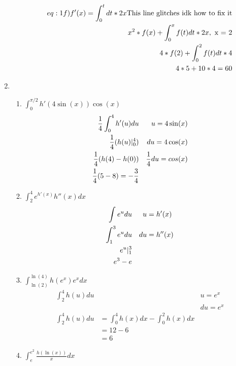 \documentclass[11pt]{article}
\begin{document}
\begin{enumerate}
\begin{enumerate}
            \begin{align*}
                \label(eq:1f)
                f'(x) = \int_{0}^{t}dt * 2x  \text{This line glitches idk how to fix it} \\
                x^2*f(x) + \int_{0}^{x}f(t)dt * 2x,\text{ x = 2} \\
                4*f(2) + \int_{0}^{2}f(t)dt * 4 \\
                4*5 + 10 * 4 = 60
            \end{align*}
        \end{enumerate}
        \item
        \begin{enumerate}
            \item \Large${\int_{0}^{\pi/2}h'(4\sin(x))\cos(x)}$\label{q:2a}
            \begin{align*}
                \label{eq:2a}
                \frac{1}{4}\int_{0}^{4}h'(u)du  && u = 4\sin(x) \\
                \frac{1}{4}(h(u)\arrowvert_{0}^{4}) && du = 4\cos(x) \\
                \frac{1}{4}(h(4) - h(0)) && \frac{1}{4}du = cos(x) \\
                \frac{1}{4}(5 - 8) = -\frac{3}{4}
            \end{align*}
            \item \Large${\int_{2}^{4}e^{h'(x)}h''(x)dx}$ \label{q:2b}
            \begin{align*}
                \label{eq:2b}
                \int_{}^{}e^{u}du && u &= h'(x) \\
                \int_{1}^{3}e^{u}du && du &= h''(x) \\
                e^u \arrowvert_{1}^{3} \\
                e^3 - e
            \end{align*}
            \item \Large$\int_{\ln(2)}^{\ln(4)}h(e^x)e^{x}dx $ \label{q:2c}
            \begin{align*}
                \label{eq:2c}
                \int_{2}^{4}h(u)du && u = e^x\\
                && du = e^x \\
                \int_{2}^{4}h(u)du &= \int_{0}^{4}h(x)dx - \int_{0}^{2}h(x)dx \\
                &= 12 - 6 \\
                &= 6
            \end{align*}
            \item \Large$\int_{e}^{e^2}\frac{h(\ln(x))}{x}dx $ \label{q:2d}

\end{enumerate}
\end{enumerate}
\end{document}
